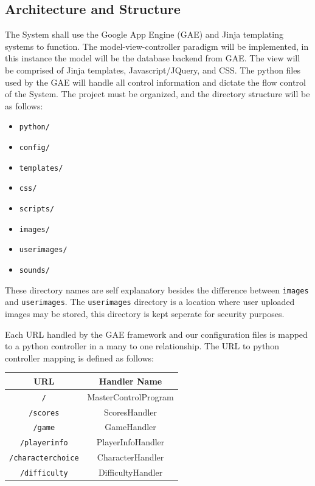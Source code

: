 \documentclass[12pt]{IEEEtran}
\begin{document}
\subsection{Architecture and Structure}
\label{subsec:arch}

	The System shall use the Google App Engine (GAE) and Jinja templating systems to function. The model-view-controller paradigm will be implemented, in this instance the model will be the database backend from 		GAE. The view will be comprised of Jinja templates, Javascript/JQuery, and CSS. The python files used by the GAE will handle all control information and dictate the flow control of the System. The project must                                 	be organized, and the directory structure will be as follows:

	\begin{itemize}
		\item \texttt{python/}
		\item \texttt{config/}
		\item \texttt{templates/}
		\item \texttt{css/}
		\item \texttt{scripts/}
		\item \texttt{images/}
		\item \texttt{userimages/}
		\item \texttt{sounds/}
	\end{itemize}

	These directory names are self explanatory besides the difference between \texttt{images} and \texttt{userimages}. The \texttt{userimages} directory is a location where user uploaded images may be stored, 		this directory is kept seperate for security purposes. 

	Each URL handled by the GAE framework and our configuration files is mapped to a python controller in a many to one relationship. The URL to python controller mapping is defined as follows:
	
	\begin{center}
		\begin{tabular}{| c | c |}\hline
			\multicolumn{1}{|c}{URL} & \multicolumn{1}{c|}{ Handler Name }\\\hline
			 \texttt{/}			& MasterControlProgram\\\hline
			 \texttt{/scores} 		& ScoresHandler\\\hline
			 \texttt{/game} 		& GameHandler\\\hline
			 \texttt{/playerinfo}	& PlayerInfoHandler\\\hline
			 \texttt{/characterchoice} & CharacterHandler\\\hline
			 \texttt{/difficulty}		& DifficultyHandler\\\hline
		\end{tabular}
	\end{center}
\end{document}
